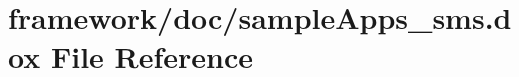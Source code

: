 \hypertarget{sample_apps__sms_8dox}{}\section{framework/doc/sample\+Apps\+\_\+sms.dox File Reference}
\label{sample_apps__sms_8dox}

